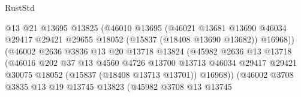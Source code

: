 \begin{lexlean}{RustStd}
\begin{coremodule}
                                      @13
                                      @21
                                      @13695
                                      @13825
                                      (@46010
                                        @13695
                                        (@46021
                                          @13681
                                          @13690
                                          @46034
                                          @29417
                                          @29421
                                          @29655
                                          @18052
                                          (@15837 (@18408 @13690 @13682))
                                          @16968))
                                      (@46002
                                        @2636
                                        @3836
                                        @13
                                        @20
                                        @13718
                                        @13824
                                        (@45982
                                          @2636
                                          @13
                                          @13718
                                          (@46016
                                            @202
                                            @37
                                            @13
                                            @4560
                                            @4726
                                            @13700
                                            @13713
                                            @46034
                                            @29417
                                            @29421
                                            @30075
                                            @18052
                                            (@15837 (@18408 @13713 @13701))
                                            @16968))
                                        (@46002
                                          @3708
                                          @3835
                                          @13
                                          @19
                                          @13745
                                          @13823
                                          (@45982
                                            @3708
                                            @13
                                            @13745

\end{coremodule}
\end{lexlean}
